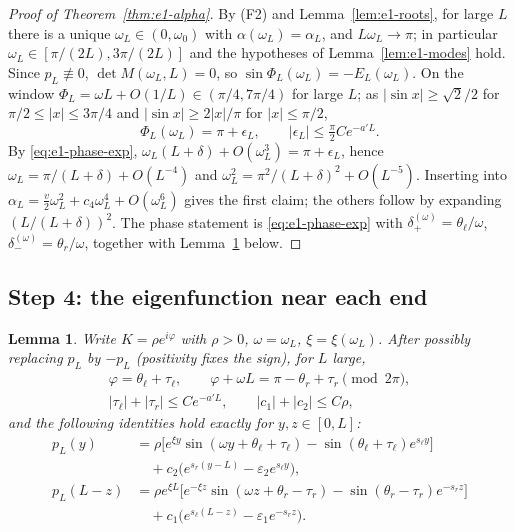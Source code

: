 \documentclass[11pt,a4paper]{article}
\newtheorem{lemma}[theorem]{Lemma}
\theoremstyle{definition}
\theoremstyle{remark}
\newcommand{\1}{\mathbf 1}
\begin{document}
\begin{proof}[Proof of Theorem~\ref{thm:e1-alpha}]
By (F2) and Lemma~\ref{lem:e1-roots}, for large $L$ there is a unique
$\omega_L\in(0,\omega_0)$ with $\alpha(\omega_L)=\alpha_L$, and $L\omega_L\to\pi$; in particular
$\omega_L\in[\pi/(2L),3\pi/(2L)]$ and the hypotheses of Lemma~\ref{lem:e1-modes} hold.
Since $p_L\not\equiv0$, $\det M(\omega_L,L)=0$, so $\sin\Phi_L(\omega_L)=-E_L(\omega_L)$.
On the window $\Phi_L=\omega L+O(1/L)\in(\pi/4,7\pi/4)$ for large $L$; as
$|\sin x|\ge\sqrt2/2$ for $\pi/2\le|x|\le3\pi/4$ and $|\sin x|\ge 2|x|/\pi$ for $|x|\le\pi/2$,
\[
\Phi_L(\omega_L)=\pi+\epsilon_L,\qquad |\epsilon_L|\le \tfrac\pi2Ce^{-a'L}.
\]
By \eqref{eq:e1-phase-exp}, $\omega_L(L+\delta)+O(\omega_L^3)=\pi+\epsilon_L$, hence
$\omega_L=\pi/(L+\delta)+O(L^{-4})$ and $\omega_L^2=\pi^2/(L+\delta)^2+O(L^{-5})$. Inserting
into $\alpha_L=\frac v2\omega_L^2+c_4\omega_L^4+O(\omega_L^6)$ gives the first claim; the others
follow by expanding $(L/(L+\delta))^2$. The phase statement is \eqref{eq:e1-phase-exp}
with $\delta_+^{(\omega)}=\theta_\ell/\omega$, $\delta_-^{(\omega)}=\theta_r/\omega$, together with
Lemma~\ref{lem:e1-profile} below.
\end{proof}

\subsection*{Step 4: the eigenfunction near each end}

\begin{lemma}\label{lem:e1-profile}
Write $K=\rho e^{i\varphi}$ with $\rho>0$, $\omega=\omega_L$, $\xi=\xi(\omega_L)$. After
possibly replacing $p_L$ by $-p_L$ (positivity fixes the sign), for $L$ large,
\begin{gather*}
\varphi=\theta_\ell+\tau_\ell,\qquad \varphi+\omega L=\pi-\theta_r+\tau_r\pmod{2\pi},\\
|\tau_\ell|+|\tau_r|\le Ce^{-a'L},\qquad |c_1|+|c_2|\le C\rho,
\end{gather*}
and the following identities hold exactly for $y,z\in[0,L]$:
\begin{align*}
p_L(y)&=\rho\bigl[e^{\xi y}\sin(\omega y+\theta_\ell+\tau_\ell)-\sin(\theta_\ell+\tau_\ell)e^{s_\ell y}\bigr]\\
&\quad+c_2\bigl(e^{s_r(y-L)}-\varepsilon_2e^{s_\ell y}\bigr),\\
p_L(L-z)&=\rho e^{\xi L}\bigl[e^{-\xi z}\sin(\omega z+\theta_r-\tau_r)-\sin(\theta_r-\tau_r)e^{-s_rz}\bigr]\\
&\quad+c_1\bigl(e^{s_\ell(L-z)}-\varepsilon_1e^{-s_rz}\bigr).
\end{align*}
\end{lemma}
\end{document}

